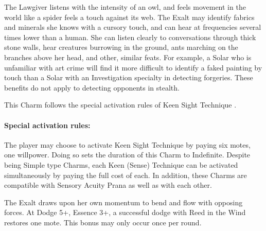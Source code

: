 The Lawgiver listens with the intensity of an owl, and feels movement in the
world like a spider feels a touch against its web. The Exalt may identify
fabrics and minerals she knows with a cursory touch, and can hear at
frequencies several times lower than a human. She can listen clearly to
conversations through thick stone walls, hear creatures burrowing in the
ground, ants marching on the branches above her head, and other, similar feats.
 For
example, a Solar who is unfamiliar with art crime will find it more difficult
to identify a faked painting by touch than a Solar with an Investigation
specialty in detecting forgeries. These benefits do not apply to detecting
opponents in stealth.

This Charm follows the special activation rules of Keen Sight Technique
\parencite*[p.~267]{ex3}.

\paragraph{Special activation rules:} The player may choose to activate Keen
Sight Technique by paying six motes, one willpower. Doing so sets the duration
of this Charm to Indefinite. Despite being Simple type Charms, each Keen
(Sense) Technique can be activated simultaneously by paying the full cost of
each. In addition, these Charms are compatible with Sensory Acuity Prana as
well as with each other.





The Exalt draws upon her own momentum to bend and flow with opposing forces.
 At Dodge 5+, Essence 3+, a
successful dodge with Reed in the Wind restores one mote. This bonus may only
occur once per round.



